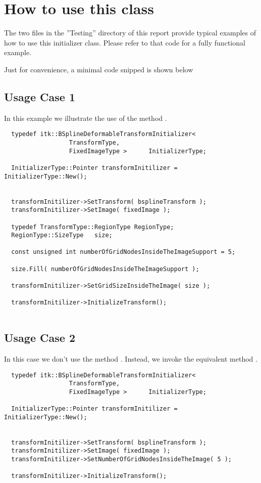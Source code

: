 \documentclass{InsightArticle}
\begin{document}
\section{How to use this class}

The two files in the ''Testing'' directory of this report provide typical
examples of how to use this initializer class. Please refer to that code for a
fully functional example.

Just for convenience, a minimal code snipped is shown below 

\subsection{Usage Case 1}
\label{sec:Case1}

In this example we illustrate the use of the method .

\small
\begin{verbatim}
  typedef itk::BSplineDeformableTransformInitializer<
                  TransformType, 
                  FixedImageType >      InitializerType;

  InitializerType::Pointer transformInitilizer = InitializerType::New();


  transformInitilizer->SetTransform( bsplineTransform );
  transformInitilizer->SetImage( fixedImage );

  typedef TransformType::RegionType RegionType;
  RegionType::SizeType   size;

  const unsigned int numberOfGridNodesInsideTheImageSupport = 5;

  size.Fill( numberOfGridNodesInsideTheImageSupport );

  transformInitilizer->SetGridSizeInsideTheImage( size );

  transformInitilizer->InitializeTransform();
 
\end{verbatim}
\normalsize


\subsection{Usage Case 2}
\label{sec:Case2}

In this case we don't use the method . Instead,
we invoke the equivalent method .

\small
\begin{verbatim}
  typedef itk::BSplineDeformableTransformInitializer<
                  TransformType, 
                  FixedImageType >      InitializerType;

  InitializerType::Pointer transformInitilizer = InitializerType::New();


  transformInitilizer->SetTransform( bsplineTransform );
  transformInitilizer->SetImage( fixedImage );
  transformInitilizer->SetNumberOfGridNodesInsideTheImage( 5 );

  transformInitilizer->InitializeTransform();
 
\end{verbatim}
\normalsize
\end{document}
